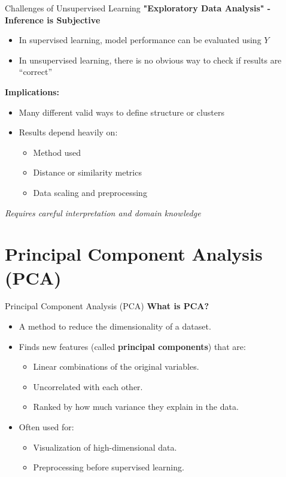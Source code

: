 \documentclass[aspectratio=169,xcolor=dvipsnames]{beamer}
\begin{document}
\begin{frame}{Challenges of Unsupervised Learning}
  \textbf{"Exploratory Data Analysis" - Inference is Subjective}
  \begin{itemize}
    \item In supervised learning, model performance can be evaluated using $Y$
    \item In unsupervised learning, there is no obvious way to check if results are “correct”
  \end{itemize}

  \vspace{0.2cm}
  \textbf{Implications:}
  \begin{itemize}
    \item Many different valid ways to define structure or clusters
    \item Results depend heavily on:
    \begin{itemize}
      \item Method used
      \item Distance or similarity metrics
      \item Data scaling and preprocessing
    \end{itemize}
  \end{itemize}

  \vspace{0.3cm}
  \textit{Requires careful interpretation and domain knowledge}
\end{frame}

\section{Principal Component Analysis (PCA)}
\begin{frame}{Principal Component Analysis (PCA)}
  \textbf{What is PCA?}
  \begin{itemize}
    \item A method to reduce the dimensionality of a dataset.
    \item Finds new features (called \textbf{principal components}) that are:
    \begin{itemize}
      \item Linear combinations of the original variables.
      \item Uncorrelated with each other.
      \item Ranked by how much variance they explain in the data.
    \end{itemize}
    \item Often used for:
    \begin{itemize}
      \item Visualization of high-dimensional data.
      \item Preprocessing before supervised learning.
    \end{itemize}
  \end{itemize}

\end{frame}
\end{document}
